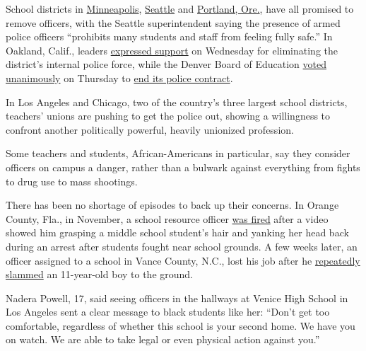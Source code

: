 School districts in
\href{https://www.twincities.com/2020/06/03/minneapolis-ends-school-resource-officer-program-will-st-paul-be-next/}{Minneapolis},
\href{https://www.seattletimes.com/seattle-news/education/seattle-schools-chief-announces-one-year-suspension-of-partnership-with-seattle-police-department/?utm_source=twitter\&utm_medium=social\&utm_campaign=article_inset_1.1}{Seattle}
and
\href{https://www.oregonlive.com/education/2020/06/portland-superintendent-says-hes-discontinuing-school-resource-officer-program.html}{Portland,
Ore.}, have all promised to remove officers, with the Seattle
superintendent saying the presence of armed police officers ``prohibits
many students and staff from feeling fully safe.'' In Oakland, Calif.,
leaders
\href{https://www.sfchronicle.com/bayarea/article/Oakland-school-board-and-superintendent-back-15331729.php}{expressed
support} on Wednesday for eliminating the district's internal police
force, while the Denver Board of Education
\href{https://twitter.com/jennifermeckles/status/1271284860439556096}{voted
unanimously} on Thursday to
\href{https://co.chalkbeat.org/2020/6/5/21281902/majority-denver-school-board-support-removing-police-from-schools}{end
its police contract}.

In Los Angeles and Chicago, two of the country's three largest school
districts, teachers' unions are pushing to get the police out, showing a
willingness to confront another politically powerful, heavily unionized
profession.

Some teachers and students, African-Americans in particular, say they
consider officers on campus a danger, rather than a bulwark against
everything from fights to drug use to mass shootings.

There has been no shortage of episodes to back up their concerns. In
Orange County, Fla., in November, a school resource officer
\href{https://www.orlandosentinel.com/news/crime/os-ne-orange-school-resource-officer-removed-after-inappropriate-force-20191108-efwod23yu5az5i4xl2lt6dbk4y-story.html}{was
fired} after a video showed him grasping a middle school student's hair
and yanking her head back during an arrest after students fought near
school grounds. A few weeks later, an officer assigned to a school in
Vance County, N.C., lost his job after he
\href{https://www.buzzfeednews.com/article/juliareinstein/school-resource-officer-slammed-middle-school-north-vance}{repeatedly
slammed} an 11-year-old boy to the ground.

Nadera Powell, 17, said seeing officers in the hallways at Venice High
School in Los Angeles sent a clear message to black students like her:
``Don't get too comfortable, regardless of whether this school is your
second home. We have you on watch. We are able to take legal or even
physical action against you.''

